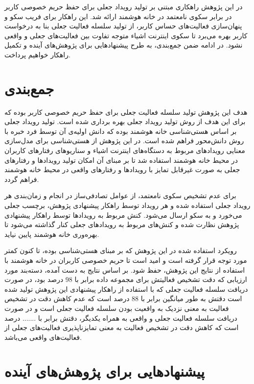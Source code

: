 
در این پژوهش راهکاری مبتنی بر تولید رویداد جعلی برای حفظ حریم خصوصی کاربر در برابر سکوی نامعتمد در خانه هوشمند ارائه شد. این راهکار برای فریب سکو و پنهان‌سازی فعالیت‌های حساس کاربر، از تولید سلسله فعالیت جعلی بنا به درخواست کاربر بهره می‌برد تا سکوی اینترنت اشیاء متوجه تفاوت بین فعالیت‌های جعلی و واقعی نشود. در ادامه ضمن جمع‌بندی، به طرح پیشنهادهایی برای پژوهش‌های آینده و تکمیل راهکار خواهیم پرداخت.

\section{جمع‌بندی}

هدف این پژوهش تولید سلسله فعالیت جعلی برای حفظ حریم خصوصی کاربر بوده که برای این هدف از روش تولید رویداد جعلی بهره برداری شده است. تولید رویداد جعلی بر اساس هستی‌شناسی خانه هوشمند بوده که دانش اولیه‌ی آن توسط فرد خبره با روش دانش‌محور فراهم شده است. در این پژوهش از هستی‌شناسی برای مدل‌سازی معنایی رویدادهای مربوط به دستگاه‌های اینترنت اشیاء و سناریوهای رفتارهای کاربران در محیط خانه هوشمند استفاده شد تا بر مبنای آن امکان تولید رویدادها و رفتارهای جعلی به صورت غیرقابل تمایز با رویدادها و رفتارهای واقعی در محیط خانه هوشمند فراهم گردد.

برای عدم تشخیص سکوی نامعتمد، از عوامل تصادفی‌ساز در انجام و زمان‌بندی هر رویداد جعلی استفاده شده و هر رویداد توسط راهکار پیشنهادی پژوهش، برچسب جعلی می‌خورد و به سکو ارسال می‌شود. کنش مربوط به رویدادها توسط راهکار پیشنهادی پژوهش نظارت شده و کنش‌های مربوط به رویدادهای جعلی کنار گذاشته می‌شود تا بهره‌وری خانه هوشمند پایین نیاید.

رویکرد استفاده شده در این پژوهش که بر مبنای هستی‌شناسی بوده، تا کنون کمتر مورد توجه قرار گرفته است و امید است تا حریم خصوصی کاربران در خانه هوشمند با استفاده از نتایج این پژوهش، حفظ شود. بر اساس نتایج به دست آمده، دسته‌بند مورد ارزیابی که دقت تشخیص فعالیتش برای مجموعه داده  برابر با 98 درصد بود، در صورت دریافت سلسله فعالیت جعلی که با استفاده از راهکار پیشنهادی این پژوهش تولید شده است دقتش به طور میانگین برابر با 88 درصد است که عدم کاهش دقت در تشخیص فعالیت به معنی نزدیک به واقعیت بودن سلسله فعالیت جعلی است و در صورت دریافت سلسله فعالیت جعلی و واقعی به همراه یکدیگر، دقتش برابر با ....... درصد است که کاهش دقت در تشخیص فعالیت به معنی تمایزناپذیری فعالیت‌های جعلی از فعالیت‌های واقعی می‌باشد.

\section{پیشنهادهایی برای پژوهش‌های آینده}

